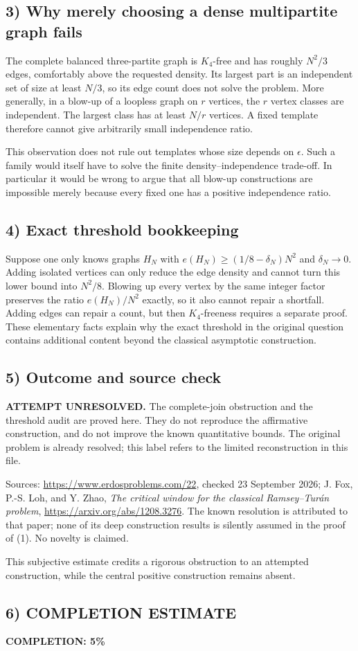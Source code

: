\subsection*{3) Why merely choosing a dense multipartite graph fails}
The complete balanced three-partite graph is $K_4$-free and has roughly $N^2/3$ edges, comfortably above the requested density. Its largest part is an independent set of size at least $N/3$, so its edge count does not solve the problem. More generally, in a blow-up of a loopless graph on $r$ vertices, the $r$ vertex classes are independent. The largest class has at least $N/r$ vertices. A fixed template therefore cannot give arbitrarily small independence ratio.

This observation does not rule out templates whose size depends on $\epsilon$. Such a family would itself have to solve the finite density--independence trade-off. In particular it would be wrong to argue that all blow-up constructions are impossible merely because every fixed one has a positive independence ratio.

\subsection*{4) Exact threshold bookkeeping}
Suppose one only knows graphs $H_N$ with $e(H_N)\ge(1/8-\delta_N)N^2$ and $\delta_N\to0$. Adding isolated vertices can only reduce the edge density and cannot turn this lower bound into $N^2/8$. Blowing up every vertex by the same integer factor preserves the ratio $e(H_N)/N^2$ exactly, so it also cannot repair a shortfall. Adding edges can repair a count, but then $K_4$-freeness requires a separate proof. These elementary facts explain why the exact threshold in the original question contains additional content beyond the classical asymptotic construction.

\subsection*{5) Outcome and source check}
\textbf{ATTEMPT UNRESOLVED.} The complete-join obstruction and the threshold audit are proved here. They do not reproduce the affirmative construction, and do not improve the known quantitative bounds. The original problem is already resolved; this label refers to the limited reconstruction in this file.

Sources: \url{https://www.erdosproblems.com/22}, checked 23 September 2026; J. Fox, P.-S. Loh, and Y. Zhao, \emph{The critical window for the classical Ramsey--Tur\'an problem}, \url{https://arxiv.org/abs/1208.3276}. The known resolution is attributed to that paper; none of its deep construction results is silently assumed in the proof of (1). No novelty is claimed.

This subjective estimate credits a rigorous obstruction to an attempted construction, while the central positive construction remains absent.
\subsection*{6) COMPLETION ESTIMATE}
\textbf{COMPLETION: 5\%}
